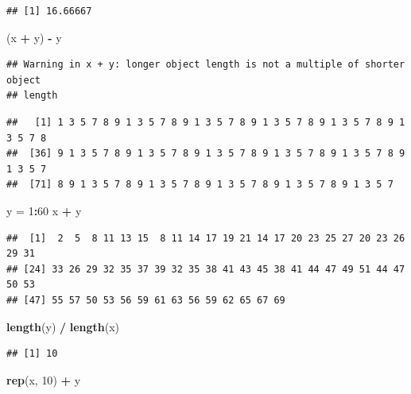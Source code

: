 \documentclass[]{book}
\newenvironment{Shaded}{\begin{snugshade}}{\end{snugshade}}
\newcommand{\KeywordTok}[1]{\textcolor[rgb]{0.13,0.29,0.53}{\textbf{#1}}}
\newcommand{\DecValTok}[1]{\textcolor[rgb]{0.00,0.00,0.81}{#1}}
\newcommand{\StringTok}[1]{\textcolor[rgb]{0.31,0.60,0.02}{#1}}
\newcommand{\OperatorTok}[1]{\textcolor[rgb]{0.81,0.36,0.00}{\textbf{#1}}}
\newcommand{\NormalTok}[1]{#1}
\theoremstyle{definition}
\theoremstyle{definition}
\theoremstyle{definition}
\theoremstyle{remark}
\begin{document}
\begin{verbatim}
## [1] 16.66667
\end{verbatim}

\begin{Shaded}
\begin{Highlighting}[]
\NormalTok{(x }\OperatorTok{+}\StringTok{ }\NormalTok{y) }\OperatorTok{-}\StringTok{ }\NormalTok{y}
\end{Highlighting}
\end{Shaded}

\begin{verbatim}
## Warning in x + y: longer object length is not a multiple of shorter object
## length
\end{verbatim}

\begin{verbatim}
##   [1] 1 3 5 7 8 9 1 3 5 7 8 9 1 3 5 7 8 9 1 3 5 7 8 9 1 3 5 7 8 9 1 3 5 7 8
##  [36] 9 1 3 5 7 8 9 1 3 5 7 8 9 1 3 5 7 8 9 1 3 5 7 8 9 1 3 5 7 8 9 1 3 5 7
##  [71] 8 9 1 3 5 7 8 9 1 3 5 7 8 9 1 3 5 7 8 9 1 3 5 7 8 9 1 3 5 7
\end{verbatim}

\begin{Shaded}
\begin{Highlighting}[]
\NormalTok{y =}\StringTok{ }\DecValTok{1}\OperatorTok{:}\DecValTok{60}
\NormalTok{x }\OperatorTok{+}\StringTok{ }\NormalTok{y}
\end{Highlighting}
\end{Shaded}

\begin{verbatim}
##  [1]  2  5  8 11 13 15  8 11 14 17 19 21 14 17 20 23 25 27 20 23 26 29 31
## [24] 33 26 29 32 35 37 39 32 35 38 41 43 45 38 41 44 47 49 51 44 47 50 53
## [47] 55 57 50 53 56 59 61 63 56 59 62 65 67 69
\end{verbatim}

\begin{Shaded}
\begin{Highlighting}[]
\KeywordTok{length}\NormalTok{(y) }\OperatorTok{/}\StringTok{ }\KeywordTok{length}\NormalTok{(x)}
\end{Highlighting}
\end{Shaded}

\begin{verbatim}
## [1] 10
\end{verbatim}

\begin{Shaded}
\begin{Highlighting}[]
\KeywordTok{rep}\NormalTok{(x, }\DecValTok{10}\NormalTok{) }\OperatorTok{+}\StringTok{ }\NormalTok{y}
\end{Highlighting}
\end{Shaded}
\end{document}
